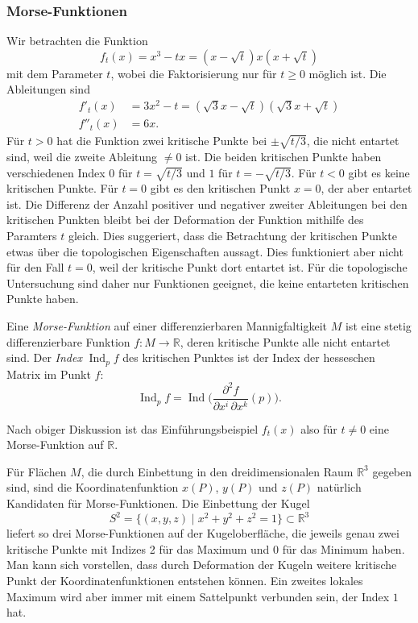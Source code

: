 \subsubsection{Morse-Funktionen}
Wir betrachten die Funktion
\[
f_t(x)
=
x^3-tx
=
(x-\!\sqrt{t})x(x+\!\sqrt{t})
\]
mit dem Parameter $t$, wobei die Faktorisierung nur für $t\ge 0$ möglich
ist.
Die Ableitungen sind
\begin{align*}
f'_t(x)
&=
3x^2-t
=
(\!\sqrt{3}x-\!\sqrt{t})
(\!\sqrt{3}x+\!\sqrt{t})
\\
f''_t(x)
&=
6x.
\end{align*}
Für $t> 0$ hat die Funktion zwei kritische Punkte bei $\pm\!\sqrt{t/3}$,
die nicht entartet sind, weil die zweite Ableitung $\ne 0$ ist.
Die beiden kritischen Punkte haben verschiedenen
Index $0$ für $t=\!\sqrt{t/3}$
und $1$ für $t=-\!\sqrt{t/3}$.
Für $t<0$ gibt es keine kritischen Punkte.
Für $t=0$ gibt es den kritischen Punkt $x=0$, der aber entartet ist.
Die Differenz der Anzahl positiver und negativer zweiter Ableitungen
bei den kritischen Punkten bleibt bei der Deformation der Funktion 
mithilfe des Paramters $t$ gleich.
Dies suggeriert, dass die Betrachtung der kritischen Punkte etwas
über die topologischen Eigenschaften aussagt.
Dies funktioniert aber nicht für den Fall $t=0$, weil der kritische
Punkt dort entartet ist.
Für die topologische Untersuchung sind daher nur Funktionen geeignet,
die keine entarteten kritischen Punkte haben.

\begin{definition}
%
Eine {\em Morse-Funktion} auf einer differenzierbaren Mannigfaltigkeit
$M$ ist eine stetig differenzierbare Funktion $f\colon M\to\mathbb{R}$,
deren kritische Punkte alle nicht entartet sind.
Der \emph{Index} $\operatorname{Ind}_pf$ des kritischen Punktes ist der Index
%
der hesseschen Matrix im Punkt $f$:
\[
\operatorname{Ind}_pf
=
\operatorname{Ind}\biggl(
\frac{\partial^2 f}{\partial x^i\,\partial x^k}(p)
\biggr).
\]
\end{definition}

Nach obiger Diskussion ist das Einführungsbeispiel $f_t(x)$ also für
$t\ne0$ eine Morse-Funktion auf $\mathbb{R}$.

Für Flächen $M$, die durch Einbettung in den dreidimensionalen Raum
$\mathbb{R}^3$ gegeben sind, sind die Koordinatenfunktion
$x(P)$, $y(P)$ und $z(P)$ natürlich Kandidaten für Morse-Funktionen.
Die Einbettung der Kugel
\[
S^2
=
\{ (x,y,z)\mid x^2+y^2+z^2=1 \}
\subset
\mathbb{R}^3
\]
liefert so drei Morse-Funktionen auf der Kugeloberfläche, die jeweils
genau zwei kritische Punkte mit Indizes 2 für das Maximum und
0 für das Minimum haben.
Man kann sich vorstellen, dass durch Deformation der Kugeln weitere
kritische Punkt der Koordinatenfunktionen entstehen können.
Ein zweites lokales Maximum wird aber immer mit einem Sattelpunkt
verbunden sein, der Index $1$ hat.


